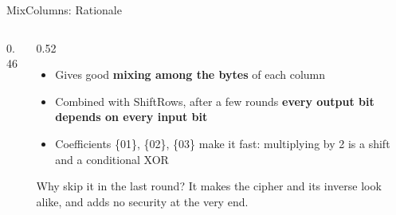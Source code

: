 \documentclass[aspectratio=169,11pt,xcolor={table}]{beamer}
\begin{document}
\begin{frame}{MixColumns: Rationale}
  \begin{columns}[c]
    \begin{column}{0.46\textwidth}
      \centering
    \end{column}
    \begin{column}{0.52\textwidth}
      \begin{itemize}\small\setlength{\itemsep}{4pt}
        \item Gives good \textbf{mixing among the bytes} of each column
        \item Combined with ShiftRows, after a few rounds \textbf{every output bit depends on every input bit}
        \item Coefficients \{01\}, \{02\}, \{03\} make it fast: multiplying by 2 is a shift and a conditional XOR
      \end{itemize}
      \begin{alertblock}{Why skip it in the last round?}
        \small It makes the cipher and its inverse look alike, and adds no security at the very end.
      \end{alertblock}
    \end{column}
  \end{columns}
\end{frame}
\end{document}
